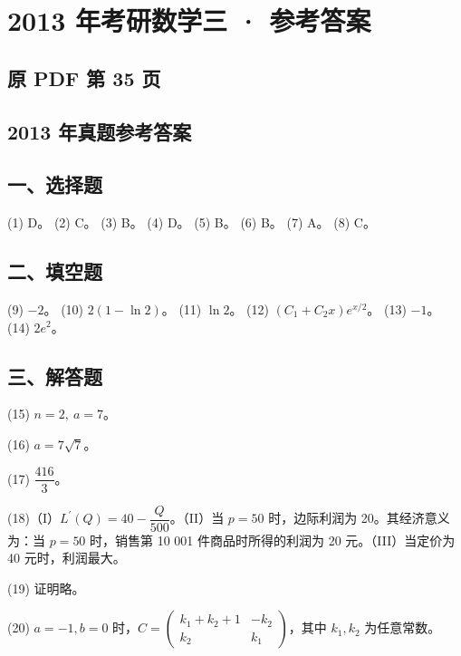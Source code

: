 \documentclass[UTF8,12pt]{ctexart}
\begin{document}
\section*{2013 年考研数学三 · 参考答案}
\subsection*{原 PDF 第 35 页}

\subsection*{2013 年真题参考答案}

\subsection*{一、选择题}

(1) D。 (2) C。 (3) B。 (4) D。 (5) B。 (6) B。 (7) A。 (8) C。


\subsection*{二、填空题}

(9) \(\displaystyle -2\)。 (10) \(\displaystyle 2(1-\ln2)\)。 (11) \(\displaystyle \ln2\)。 (12) \(\displaystyle (C_1+C_2x)e^{x/2}\)。 (13) \(\displaystyle -1\)。 (14) \(\displaystyle 2e^2\)。


\subsection*{三、解答题}

(15) \(\displaystyle n=2,\allowbreak \ a=7\)。


(16) \(\displaystyle a=7\sqrt7\)。


(17) \(\displaystyle \dfrac{\displaystyle 416}{\displaystyle 3}\)。


(18)（I）\(\displaystyle L^{\prime}(Q)=40-\dfrac{\displaystyle Q}{\displaystyle 500}\)。（II）当 \(\displaystyle p=50\) 时，边际利润为 20。其经济意义为：当 \(\displaystyle p=50\) 时，销售第 10 001 件商品时所得的利润为 20 元。（III）当定价为 40 元时，利润最大。


(19) 证明略。


(20) \(\displaystyle a=-1,\allowbreak b=0\) 时，\(\displaystyle C=\begin{pmatrix}k_1+k_2+1&-k_2\\k_2&k_1\end{pmatrix}\)，其中 \(\displaystyle k_1,\allowbreak k_2\) 为任意常数。
\end{document}
